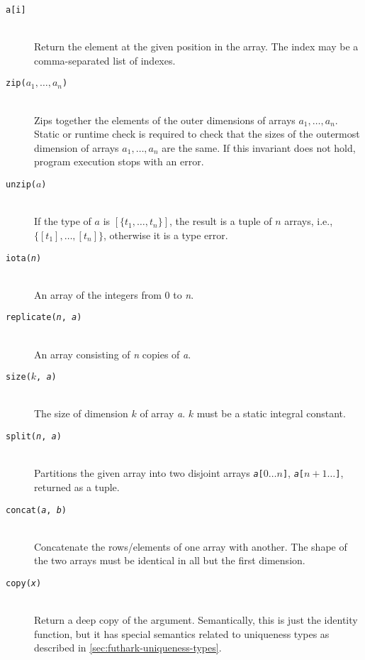 \documentclass[oneside]{memoir}
\begin{document}
\begin{description}
  \item[\texttt{a[i]}]\hfill\\
    Return the element at the given position in the array.  The index
    may be a comma-separated list of indexes.

  \item[\texttt{zip($a_1, \ldots, a_n$)}]\hfill\\
    Zips together the elements of the outer dimensions of arrays $a_1,
    \ldots, a_n$.  Static or runtime check is required to check that
    the sizes of the outermost dimension of arrays $a_1, \ldots, a_n$
    are the same.  If this invariant does not hold, program execution
    stops with an error.

  \item[\texttt{unzip($a$)}]\hfill\\
    If the type of $a$ is $[\{t_1, \ldots, t_n\}]$, the result is a
    tuple of $n$ arrays, i.e., $\{[t_1], \ldots, [t_n]\}$, otherwise
    it is a type error.

  \item[\texttt{iota(\textit{n})}]\hfill\\
    An array of the integers from $0$ to \textit{n}.

  \item[\texttt{replicate(\textit{n}, \textit{a})}]\hfill\\
    An array consisting of \textit{n} copies of \textit{a}.

  \item[\texttt{size($k$, \textit{a})}]\hfill\\
    The size of dimension $k$ of array \textit{a}.  $k$ must be a
    static integral constant.

  \item[\texttt{split(\textit{n}, \textit{a})}]\hfill\\
    Partitions the given array into two disjoint arrays
    \texttt{\textit{a}[$0\ldots{}n$]},
    \texttt{\textit{a}[$n+1\ldots{}$]}, returned as a tuple.

  \item[\texttt{concat(\textit{a}, \textit{b})}]\hfill\\
    Concatenate the rows/elements of one array with another.  The
    shape of the two arrays must be identical in all but the first
    dimension.

  \item[\texttt{copy(\textit{x})}]\hfill\\
    Return a deep copy of the argument.  Semantically, this is just
    the identity function, but it has special semantics related to
    uniqueness types as described in \cref{sec:futhark-uniqueness-types}.


\end{description}
\end{document}
